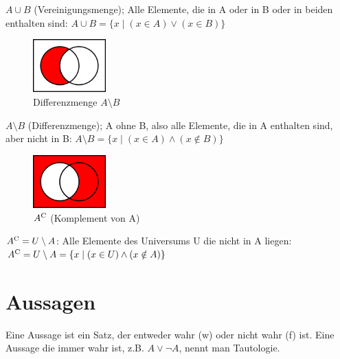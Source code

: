 \documentclass[a4paper]{article}
\begin{document}
$A \cup B$ (Vereinigungsmenge); Alle Elemente, die in A oder in B oder in beiden enthalten sind: $A \cup B = \{ x \mid (x \in A) \lor (x \in B)\} $
\begin{figure}[H]
\centering
\includegraphics[width=0.25\textwidth]{images/differenzmenge.png}
\caption{\label{fig:differenzmenge}Differenzmenge $A \setminus B$}
\end{figure}
$A \setminus B$ (Differenzmenge); A ohne B, also alle Elemente, die in A enthalten sind, aber nicht in B: $A \setminus B = \{ x \mid (x \in A) \land (x \notin B)\} $
\begin{figure}[H]
\centering
\includegraphics[width=0.25\textwidth]{images/komplement.png}
\caption{\label{fig:komplement}$A^{\rm C}$ (Komplement von A)}
\end{figure}
$A^{\rm C} = U \setminus A$: Alle Elemente des Universums U die nicht in A liegen: $A ^{\rm C} = U \setminus A = \{ x \mid (x \in U) \land (x \notin A)\} $

\section{Aussagen}
Eine Aussage ist ein Satz, der entweder wahr (w) oder nicht wahr (f) ist. Eine Aussage die immer wahr ist, z.B. $ A \lor \neg A$, nennt man Tautologie.
\end{document}
